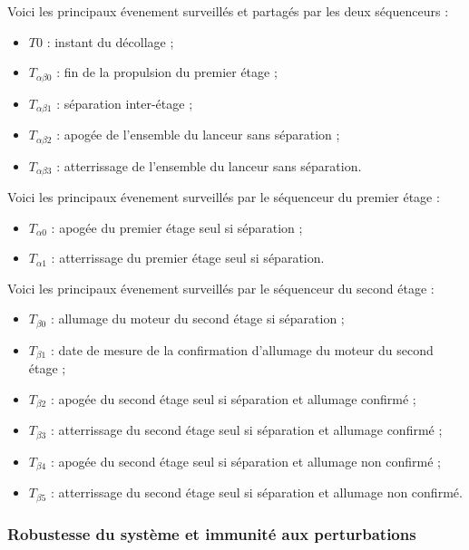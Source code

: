 \newpage

Voici les principaux évenement surveillés et partagés par les deux séquenceurs :
\begin{itemize}
    \item $T0$ : instant du décollage ;
    \item $T_{\alpha\beta0}$ : fin de la propulsion du premier étage ;
    \item $T_{\alpha\beta1}$ : séparation inter-étage ;
    \item $T_{\alpha\beta2}$ : apogée de l'ensemble du lanceur sans séparation ;
    \item $T_{\alpha\beta3}$ : atterrissage de l'ensemble du lanceur sans séparation.\\
\end{itemize}

Voici les principaux évenement surveillés par le séquenceur du premier étage :
\begin{itemize}
    \item $T_{\alpha0}$ : apogée du premier étage seul si séparation ;
    \item $T_{\alpha1}$ : atterrissage du premier étage seul si séparation.\\
\end{itemize}

Voici les principaux évenement surveillés par le séquenceur du second étage :
\begin{itemize}
    \item $T_{\beta0}$ : allumage du moteur du second étage si séparation ;
    \item $T_{\beta1}$ : date de mesure de la confirmation d’allumage du moteur du second étage ;
    \item $T_{\beta2}$ : apogée du second étage seul si séparation et allumage confirmé ;
    \item $T_{\beta3}$ : atterrissage du second étage seul si séparation et allumage confirmé ;
    \item $T_{\beta4}$ : apogée du second étage seul si séparation et allumage non confirmé ;
    \item $T_{\beta5}$ : atterrissage du second étage seul si séparation et allumage non confirmé.\\
\end{itemize}

\subsubsection{Robustesse du système et immunité aux perturbations}

